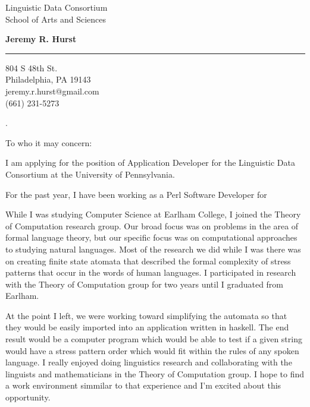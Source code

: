 \documentclass{letter} %
\begin{document}
\signature{Jeremy R. Hurst}           %
\longindentation=0pt                       %
\let\raggedleft\raggedright                %
 
 
\begin{letter}{Linguistic Data Consortium \\
School of Arts and Sciences }



\begin{center}
{\large\bf Jeremy R. Hurst} 
\end{center}
\medskip\hrule height 1pt
\begin{center}
{804 S 48th St. \\ Philadelphia, PA 19143 \\ jeremy.r.hurst@gmail.com \\(661) 231-5273} 
\end{center} \vfill %
\vspace*{-100mm}%
\noindent .
\vspace*{50mm}
\opening{To who it may concern:} 
 
\noindent I am applying for the position of Application Developer for the Linguistic Data Consortium at the University of Pennsylvania.

\noindent For the past year, I have been working as a Perl Software Developer for 

\noindent While I was studying Computer Science at Earlham College, I joined the Theory of Computation research group.
 Our broad focus was on problems in the area of formal language theory, but our specific focus was on computational approaches to studying natural languages.
 Most of the research we did while I was there was on creating finite state atomata that described the formal complexity of stress patterns that occur in the words of human languages.
 I participated in research with the Theory of Computation group for two years until I graduated from Earlham.

\noindent At the point I left, we were working toward simplifying the automata so that they would be easily imported into an application written in haskell.
 The end result would be a computer program which would be able to test if a given string would have a stress pattern order which would fit within the rules of any spoken language.
 I really enjoyed doing linguistics research and collaborating with the linguists and mathematicians in the Theory of Computation group.
 I hope to find a work environment simmilar to that experience and I'm excited about this opportunity. 


\end{letter}
\end{document}
